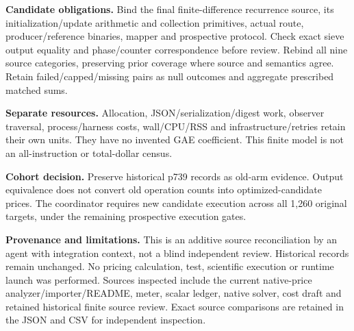 \documentclass[11pt]{article}
\begin{document}
\textbf{Candidate obligations.} Bind the final finite-difference recurrence source, its initialization/update arithmetic and collection primitives, actual route, producer/reference binaries, mapper and prospective protocol. Check exact sieve output equality and phase/counter correspondence before review. Rebind all nine source categories, preserving prior coverage where source and semantics agree. Retain failed/capped/missing pairs as null outcomes and aggregate prescribed matched sums.

\textbf{Separate resources.} Allocation, JSON/serialization/digest work, observer traversal, process/harness costs, wall/CPU/RSS and infrastructure/retries retain their own units. They have no invented GAE coefficient. This finite model is not an all-instruction or total-dollar census.

\textbf{Cohort decision.} Preserve historical p739 records as old-arm evidence. Output equivalence does not convert old operation counts into optimized-candidate prices. The coordinator requires new candidate execution across all 1,260 original targets, under the remaining prospective execution gates.

\textbf{Provenance and limitations.} This is an additive source reconciliation by an agent with integration context, not a blind independent review. Historical records remain unchanged. No pricing calculation, test, scientific execution or runtime launch was performed. Sources inspected include the current native-price analyzer/importer/README, meter, scalar ledger, native solver, cost draft and retained historical finite source review. Exact source comparisons are retained in the JSON and CSV for independent inspection.
\end{document}
